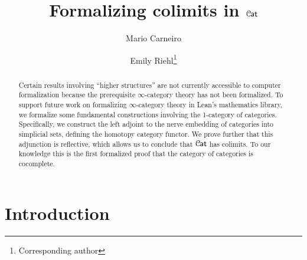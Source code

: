 \documentclass[a4paper,UKenglish,cleveref, autoref, thm-restate]{lipics-v2021}
\title{Formalizing colimits in $\Cat$}
\author{Mario Carneiro}{Chalmers University of Technology, Sweden} {marioc@chalmers.se}{https://orcid.org/0000-0002-0470-5249}{}%
\author{Emily Riehl\footnote{Corresponding author}}{Department of Mathematics, Johns Hopkins University, 3400 N Charles Street, Baltimore, MD, USA }{eriehl@jhu.edu}{https://orcid.org/0000-0002-8465-8859}{NSF DMS-1652600, AFOSR FA9550-21-1-0009, ARO W911NF-20-1-0082}
\newcommand{\cat}[1]{\textup{\textsf{#1}}}%
\newcommand{\1}{\mathbbe{1}}
\newcommand{\2}{\mathbbe{2}}
\newcommand{\3}{\mathbbe{3}}
\newcommand{\Cat}{\mathcal{C}{\kern-.75pt}\cat{at}}
\begin{document}
\maketitle

\begin{abstract}
  Certain results involving ``higher structures'' are not currently accessible to computer formalization because the prerequisite $\infty$-category theory has not been formalized. To support future work on formalizing $\infty$-category theory in Lean's mathematics library, we formalize some fundamental constructions involving the 1-category of categories. Specifically, we construct the left adjoint to the nerve embedding of categories into simplicial sets, defining the homotopy category functor. We prove further that this adjunction is reflective, which allows us to conclude that $\Cat$ has colimits. To our knowledge this is the first formalized proof that the category of categories is cocomplete.




\end{abstract}

\maketitle

\newpage
\tableofcontents

\newpage
\section{Introduction}
\end{document}
